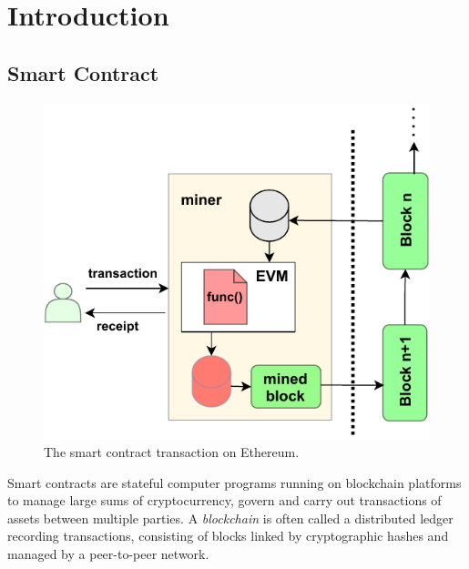 
\chapter{Introduction} %
\label{ch:introduction} %
\section{Smart Contract}
\label{ch:preliminary}
\begin{figure}[t]
	\centering
	\includegraphics[scale=0.9]{Figures/Chapter5/SmartContractTransaction.pdf}
	\caption{The smart contract transaction on Ethereum.}
	\label{fig:smartcontractTransaction}
\end{figure}
Smart contracts are stateful computer programs running on blockchain platforms to manage large sums of
cryptocurrency, govern and carry out transactions of assets between multiple parties.
A \emph{blockchain} is often called a distributed ledger recording transactions, consisting of blocks linked by cryptographic hashes and managed by a peer-to-peer network.
